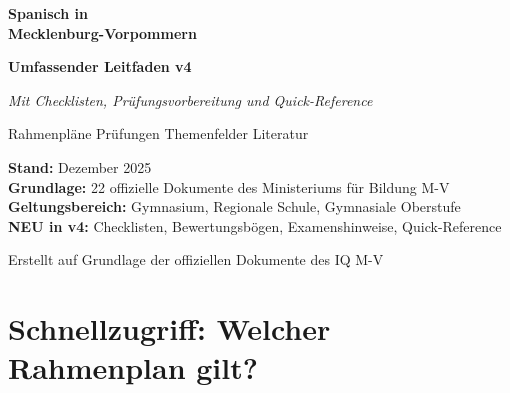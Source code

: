 \documentclass[11pt,a4paper]{article}
\begin{document}
\begin{titlepage}
\centering
\vspace*{2.5cm}
{\Huge\bfseries\color{mainblue} Spanisch in\\[0.3em]Mecklenburg-Vorpommern\par}
\vspace{0.6cm}
{\LARGE\bfseries Umfassender Leitfaden v4\par}
\vspace{0.4cm}
{\large\textit{Mit Checklisten, Prüfungsvorbereitung und Quick-Reference}\par}
\vspace{0.5cm}
{\large Rahmenpläne \textbullet{} Prüfungen \textbullet{} Themenfelder \textbullet{} Literatur\par}
\vspace{1.5cm}

\begin{tcolorbox}[colback=lightgray, colframe=lightgray, width=13cm, boxrule=0pt]
\textbf{Stand:} Dezember 2025\\[0.2em]
\textbf{Grundlage:} 22 offizielle Dokumente des Ministeriums für Bildung M-V\\[0.2em]
\textbf{Geltungsbereich:} Gymnasium, Regionale Schule, Gymnasiale Oberstufe\\[0.2em]
\textbf{NEU in v4:} Checklisten, Bewertungsbögen, Examenshinweise, Quick-Reference
\end{tcolorbox}

\vspace{1.5cm}

\vfill
{\small Erstellt auf Grundlage der offiziellen Dokumente des IQ M-V\par}
\end{titlepage}

\tableofcontents
\newpage

\section{Schnellzugriff: Welcher Rahmenplan gilt?}
\end{document}
